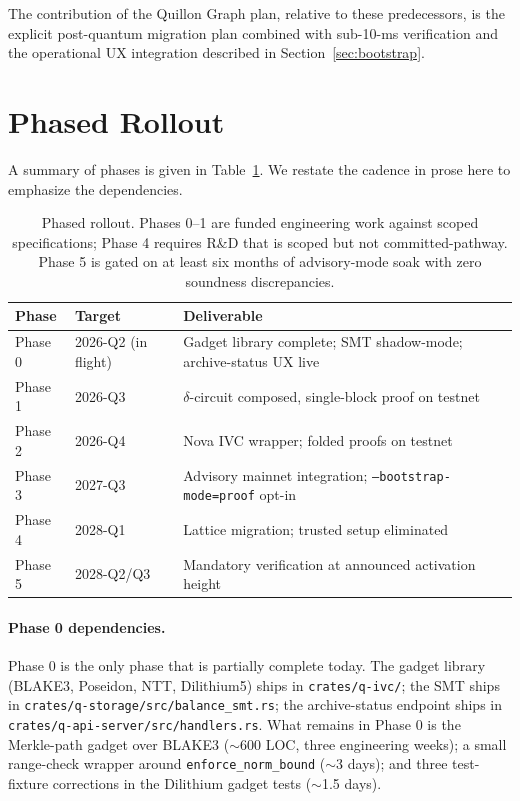 \documentclass[11pt,a4paper]{article}
\begin{document}
The contribution of the Quillon Graph plan, relative to these
predecessors, is the explicit post-quantum migration plan combined
with sub-10-ms verification and the operational UX integration
described in Section~\ref{sec:bootstrap}.

\section{Phased Rollout}
\label{sec:rollout}

A summary of phases is given in Table~\ref{tab:phases}. We restate
the cadence in prose here to emphasize the dependencies.

\begin{table}[h]
\centering
\small
\begin{tabularx}{\linewidth}{l l X}
\toprule
\textbf{Phase} & \textbf{Target} & \textbf{Deliverable} \\
\midrule
Phase 0  & 2026-Q2 (in flight) & Gadget library complete; SMT shadow-mode; archive-status UX live \\
Phase 1  & 2026-Q3 & $\delta$-circuit composed, single-block proof on testnet \\
Phase 2  & 2026-Q4 & Nova IVC wrapper; folded proofs on testnet \\
Phase 3  & 2027-Q3 & Advisory mainnet integration; \texttt{--bootstrap-mode=proof} opt-in \\
Phase 4  & 2028-Q1 & Lattice migration; trusted setup eliminated \\
Phase 5  & 2028-Q2/Q3 & Mandatory verification at announced activation height \\
\bottomrule
\end{tabularx}
\caption{Phased rollout. Phases 0--1 are funded engineering work
against scoped specifications; Phase 4 requires R\&D that is
scoped but not committed-pathway. Phase 5 is gated on at least
six months of advisory-mode soak with zero soundness discrepancies.}
\label{tab:phases}
\end{table}

\paragraph{Phase 0 dependencies.} Phase 0 is the only phase that is
partially complete today. The gadget library (BLAKE3, Poseidon, NTT,
Dilithium5) ships in \texttt{crates/q-ivc/}; the SMT ships in
\texttt{crates/q-storage/src/balance\_smt.rs}; the archive-status
endpoint ships in \texttt{crates/q-api-server/src/handlers.rs}. What
remains in Phase 0 is the Merkle-path gadget over BLAKE3
($\sim$600 LOC, three engineering weeks); a small range-check
wrapper around \texttt{enforce\_norm\_bound} ($\sim$3 days); and
three test-fixture corrections in the Dilithium gadget tests
($\sim$1.5 days).
\end{document}
